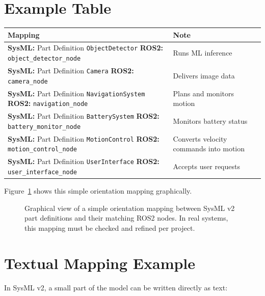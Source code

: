 \section{Example Table}
\begingroup
\small
\setlength{\tabcolsep}{4pt}
\renewcommand{\arraystretch}{1.15}
\begin{longtable}{@{}p{}p{}@{}}
\toprule
Mapping & Note\\
\midrule
\textbf{SysML:} Part Definition \texttt{ObjectDetector}\newline
\textbf{ROS2:} \texttt{object\_detector\_node} & Runs ML inference\\
\textbf{SysML:} Part Definition \texttt{Camera}\newline
\textbf{ROS2:} \texttt{camera\_node} & Delivers image data\\
\textbf{SysML:} Part Definition \texttt{NavigationSystem}\newline
\textbf{ROS2:} \texttt{navigation\_node} & Plans and monitors motion\\
\textbf{SysML:} Part Definition \texttt{BatterySystem}\newline
\textbf{ROS2:} \texttt{battery\_monitor\_node} & Monitors battery status\\
\textbf{SysML:} Part Definition \texttt{MotionControl}\newline
\textbf{ROS2:} \texttt{motion\_control\_node} & Converts velocity commands into motion\\
\textbf{SysML:} Part Definition \texttt{UserInterface}\newline
\textbf{ROS2:} \texttt{user\_interface\_node} & Accepts user requests\\
\bottomrule
\end{longtable}
\endgroup

Figure~\ref{fig:kap16-mapping-sysml-ros2} shows this simple orientation mapping graphically.

\begin{figure}[H]
  \centering
  \caption{Graphical view of a simple orientation mapping between SysML v2 part definitions and their matching ROS2 nodes. In real systems, this mapping must be checked and refined per project.}
  \label{fig:kap16-mapping-sysml-ros2}
\end{figure}

\section{Textual Mapping Example}
In SysML v2, a small part of the model can be written directly as text:

